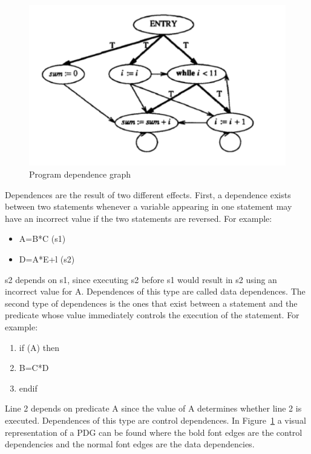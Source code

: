 \documentclass[authoryear,preprint]{sigplanconf}
\begin{document}
\begin{figure}[ht]
	\centering
	\includegraphics[width=.9\linewidth]{figures/pdg}
         \caption[Program dependence graph]{\label{fig2}Program dependence graph}
\end{figure}

Dependences are the result of two different effects. First, a dependence exists between two statements whenever a variable appearing in one statement may have an incorrect value if the two statements are reversed. For example: 
\begin{itemize}
\item A=B*C (s1)
\item D=A*E+l (s2)
\end{itemize}
s2 depends on s1, since executing s2 before s1 would result in s2 using an incorrect value for A. Dependences of this type are called data dependences. The second type of dependences is the ones that exist between a statement and the predicate whose value immediately controls the execution of the statement. For example:
\begin{enumerate}
\item if (A) then
\item   B=C*D 
\item endif
\end{enumerate}
Line 2 depends on predicate A since the value of A determines whether line 2 is executed. Dependences of this type are control dependences. In Figure~\ref{fig2} a visual representation of a PDG can be found where the bold font edges are the control dependencies and the normal font edges are the data dependencies.
\end{document}
